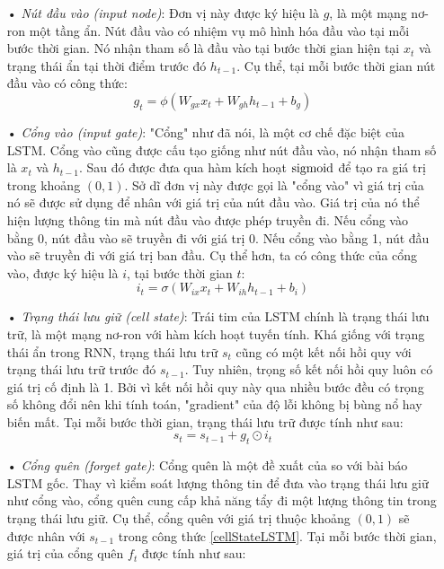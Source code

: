 \begin{itemize}
	\item[•] \textit{Nút đầu vào (input node)}: Đơn vị này được ký hiệu là $g$, là một mạng nơ-ron một tầng ẩn. Nút đầu vào có nhiệm vụ mô hình hóa đầu vào tại mỗi bước thời gian. Nó nhận tham số là đầu vào tại bước thời gian hiện tại $x_t$ và trạng thái ẩn tại thời điểm trước đó $h_{t-1}$. Cụ thể, tại mỗi bước thời gian nút đầu vào có công thức:
	\begin{equation} \label{inputNodeLSTM}
		g_t = \phi \left(W_{gx}x_t + W_{gh}h_{t-1} + b_g \right)
	\end{equation}
	\item[•] \textit{Cổng vào (input gate)}: "Cổng" như đã nói, là một cơ chế đặc biệt của LSTM. Cổng vào cũng được cấu tạo giống như nút đầu vào, nó nhận tham số là $x_t$ và $h_{t-1}$. Sau đó được đưa qua hàm kích hoạt $\mathrm{sigmoid}$ để tạo ra giá trị trong khoảng $(0,1)$. Sở dĩ đơn vị này được gọi là "cổng vào" vì giá trị của nó sẽ được sử dụng để nhân với giá trị của nút đầu vào. Giá trị của nó thể hiện lượng thông tin mà nút đầu vào được phép truyền đi. Nếu cổng vào bằng 0, nút đầu vào sẽ truyền đi với giá trị 0. Nếu cổng vào bằng 1, nút đầu vào sẽ truyền đi với giá trị ban đầu. Cụ thể hơn, ta có công thức của cổng vào, được ký hiệu là $i$, tại bước thời gian $t$:
	\begin{equation} \label{inputGateLSTM}
		i_t = \sigma \left(W_{ix}x_t + W_{ih}h_{t-1} + b_i \right)
	\end{equation}
	\item[•] \textit{Trạng thái lưu giữ (cell state)}: Trái tim của LSTM chính là trạng thái lưu trữ, là một mạng nơ-ron với hàm kích hoạt tuyến tính. Khá giống với trạng thái ẩn trong RNN, trạng thái lưu trữ $s_t$ cũng có một kết nối hồi quy với trạng thái lưu trữ trước đó $s_{t-1}$. Tuy nhiên, trọng số kết nối hồi quy luôn có giá trị cố định là 1. Bởi vì kết nối hồi quy này qua nhiều bước đều có trọng số không đổi nên khi tính toán, "gradient" của độ lỗi không bị bùng nổ hay biến mất. Tại mỗi bước thời gian, trạng thái lưu trữ được tính như sau:
	\begin{equation} \label{cellStateLSTM}
		s_t = s_{t-1} + g_t \odot i_t
	\end{equation}
	\item[•] \textit{Cổng quên (forget gate)}: Cổng quên là một đề xuất của \cite{gers2000} so với bài báo LSTM gốc. Thay vì kiểm soát lượng thông tin để đưa vào trạng thái lưu giữ như cổng vào, cổng quên cung cấp khả năng tẩy đi một lượng thông tin trong trạng thái lưu giữ. Cụ thể, cổng quên với giá trị thuộc khoảng $(0,1)$ sẽ được nhân với $s_{t-1}$ trong công thức \ref{cellStateLSTM}. Tại mỗi bước thời gian, giá trị của cổng quên $f_t$ được tính như sau:

\end{itemize}
